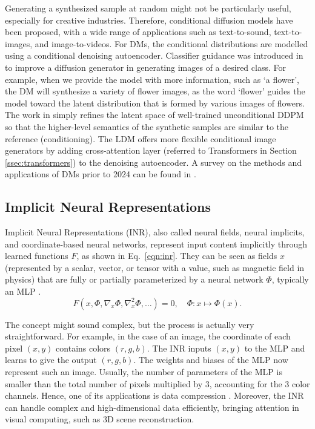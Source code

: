 \documentclass[11pt,a4paper]{article}
\begin{document}
Generating a synthesized sample at random might not be particularly useful, especially for creative industries. Therefore, conditional diffusion models have been proposed, with a wide range of applications such as text-to-sound, text-to-images, and image-to-videos. For DMs, the conditional distributions are modelled using a conditional denoising autoencoder. Classifier guidance was introduced in \cite{Dhariwal:Diffusion:2021} to improve a diffusion generator in generating images of a desired class. For example, when we provide the model with more information, such as `a flower', the DM will synthesize a variety of flower images, as the word `flower' guides the model toward the latent distribution that is formed by various images of flowers. The work in \cite{Choi:ILVR:2021} simply refines the latent space of well-trained unconditional DDPM so that the higher-level semantics of the synthetic samples are similar to the reference (conditioning).
The LDM \cite{Rombach:LDM:2022} offers more flexible conditional image generators by adding cross-attention layer (referred to Transformers in Section \ref{ssec:transformers}) to the denoising autoencoder. A survey on the methods and applications of DMs prior to 2024 can be found in \cite{Cao:survey:2024}.



\subsection{Implicit Neural Representations}

Implicit Neural Representations (INR), also called neural fields, neural implicits, and coordinate-based neural networks, represent input content implicitly through learned functions $F$, as shown in Eq.~\ref{eqn:inr}. They can be seen as fields $x$ (represented by a scalar, vector, or tensor with a value, such as magnetic field in physics) that are fully or partially parameterized by a neural network $\Phi$, typically an MLP \cite{xie2022neural}.
\begin{equation}
F(x, \Phi, \nabla_x \Phi, \nabla_x^2 \Phi, \dots) = 0, \quad \Phi : x \mapsto \Phi(x).
\label{eqn:inr}
\end{equation}

 The concept might sound complex, but the process is actually very straightforward. For example, in the case of an image, the coordinate of each pixel $(x, y)$ contains colors $(r, g, b)$. The INR inputs $(x, y)$ to the MLP and learns to give the output $(r, g, b)$. The weights and biases of the MLP now represent such an image. Usually, the number of parameters of the MLP is smaller than the total number of pixels multiplied by 3, accounting for the 3 color channels. Hence, one of its applications is data compression \cite{kwan2024hinerv}. Moreover, the INR can handle complex and high-dimensional data efficiently, bringing attention in visual computing, such as 3D scene reconstruction.
\end{document}
